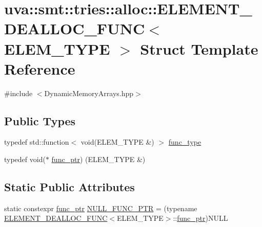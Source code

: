 \hypertarget{structuva_1_1smt_1_1tries_1_1alloc_1_1_e_l_e_m_e_n_t___d_e_a_l_l_o_c___f_u_n_c}{}\section{uva\+:\+:smt\+:\+:tries\+:\+:alloc\+:\+:E\+L\+E\+M\+E\+N\+T\+\_\+\+D\+E\+A\+L\+L\+O\+C\+\_\+\+F\+U\+N\+C$<$ E\+L\+E\+M\+\_\+\+T\+Y\+P\+E $>$ Struct Template Reference}
\label{structuva_1_1smt_1_1tries_1_1alloc_1_1_e_l_e_m_e_n_t___d_e_a_l_l_o_c___f_u_n_c}


{\ttfamily \#include $<$Dynamic\+Memory\+Arrays.\+hpp$>$}

\subsection*{Public Types}
\begin{DoxyCompactItemize}
\item 
typedef std\+::function$<$ void(E\+L\+E\+M\+\_\+\+T\+Y\+P\+E \&) $>$ \hyperlink{structuva_1_1smt_1_1tries_1_1alloc_1_1_e_l_e_m_e_n_t___d_e_a_l_l_o_c___f_u_n_c_a46500627bdbbdb00846c63fe5faec2a2}{func\+\_\+type}
\item 
typedef void($\ast$ \hyperlink{structuva_1_1smt_1_1tries_1_1alloc_1_1_e_l_e_m_e_n_t___d_e_a_l_l_o_c___f_u_n_c_afe5ab62494185e4fc3118423b40b0928}{func\+\_\+ptr}) (E\+L\+E\+M\+\_\+\+T\+Y\+P\+E \&)
\end{DoxyCompactItemize}
\subsection*{Static Public Attributes}
\begin{DoxyCompactItemize}
\item 
static constexpr \hyperlink{structuva_1_1smt_1_1tries_1_1alloc_1_1_e_l_e_m_e_n_t___d_e_a_l_l_o_c___f_u_n_c_afe5ab62494185e4fc3118423b40b0928}{func\+\_\+ptr} \hyperlink{structuva_1_1smt_1_1tries_1_1alloc_1_1_e_l_e_m_e_n_t___d_e_a_l_l_o_c___f_u_n_c_ae9312b301dcf1a8016dc2eef0c9b11d3}{N\+U\+L\+L\+\_\+\+F\+U\+N\+C\+\_\+\+P\+T\+R} = (typename \hyperlink{structuva_1_1smt_1_1tries_1_1alloc_1_1_e_l_e_m_e_n_t___d_e_a_l_l_o_c___f_u_n_c}{E\+L\+E\+M\+E\+N\+T\+\_\+\+D\+E\+A\+L\+L\+O\+C\+\_\+\+F\+U\+N\+C}$<$E\+L\+E\+M\+\_\+\+T\+Y\+P\+E$>$\+::\hyperlink{structuva_1_1smt_1_1tries_1_1alloc_1_1_e_l_e_m_e_n_t___d_e_a_l_l_o_c___f_u_n_c_afe5ab62494185e4fc3118423b40b0928}{func\+\_\+ptr})N\+U\+L\+L
\end{DoxyCompactItemize}


